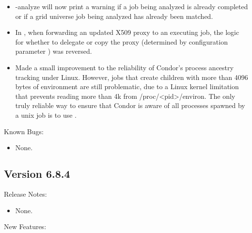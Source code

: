 \begin{itemize}
\item {} -analyze will now print a warning if a job being analyzed
is already completed or if a grid universe job being analyzed has already
been matched.

\item In , when forwarding an updated X509 proxy to an
executing job, the logic for whether to delegate or copy the proxy 
(determined by configuration parameter
) was reversed.

\item Made a small improvement to the reliability of Condor's process
ancestry tracking under Linux.  However, jobs that create children
with more than 4096 bytes of environment are still problematic, due to
a Linux kernel limitation that prevents reading more than 4k from
/proc/<pid>/environ.  The only truly reliable way to ensure that
Condor is aware of all processes spawned by a unix job is to use
.

\end{itemize}

\noindent Known Bugs:

\begin{itemize}

\item None.

\end{itemize}


\subsection*{\label{sec:New-6-8-4}Version 6.8.4}

\noindent Release Notes:

\begin{itemize}

\item None.

\end{itemize}


\noindent New Features:

